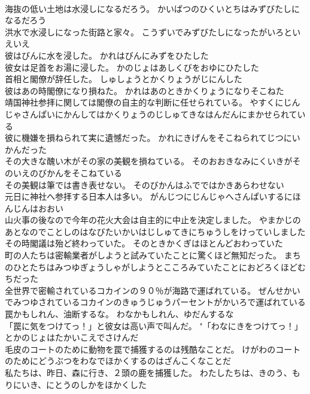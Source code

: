 \documentclass[8pt]{extreport}
\begin{document}
\begin{CJK}{UTF8}{min}
\\	海抜の低い土地は水浸しになるだろう。	かいばつのひくいとちはみずびたしになるだろう 
\\	洪水で水浸しになった街路と家々。	こうずいでみずびたしになったがいろといえいえ 
\\	彼はびんに水を浸した。	かれはびんにみずをひたした 
\\	彼女は足首をお湯に浸した。	かのじょはあしくびをおゆにひたした 
\\	首相と閣僚が辞任した。	しゅしょうとかくりょうがじにんした 
\\	彼はあの時閣僚になり損ねた。	かれはあのときかくりょうになりそこねた 
\\	靖国神社参拝に関しては閣僚の自主的な判断に任せられている。	やすくにじんじゃさんぱいにかんしてはかくりょうのじしゅてきなはんだんにまかせられている 
\\	彼に機嫌を損ねられて実に遺憾だった。	かれにきげんをそこねられてじつにいかんだった 
\\	その大きな醜い木がその家の美観を損ねている。	そのおおきなみにくいきがそのいえのびかんをそこねている 
\\	その美観は筆では書き表せない。	そのびかんはふでではかきあらわせない 
\\	元日に神社へ参拝する日本人は多い。	がんじつにじんじゃへさんぱいするにほんじんはおおい 
\\	山火事の後なので今年の花火大会は自主的に中止を決定しました。	やまかじのあとなのでことしのはなびたいかいはじしゅてきにちゅうしをけっていしました 
\\	その時閣議は殆ど終わっていた。	そのときかくぎはほとんどおわっていた 
\\	町の人たちは密輸業者がしようと試みていたことに驚くほど無知だった。	まちのひとたちはみつゆぎょうしゃがしようとこころみていたことにおどろくほどむちだった 
\\	全世界で密輸されているコカインの９０％が海路で運ばれている。	ぜんせかいでみつゆされているコカインのきゅうじゅうパーセントがかいろで運ばれている 
\\	罠かもしれん、油断するな。	わなかもしれん、ゆだんするな 
\\	「罠に気をつけてっ！」と彼女は高い声で叫んだ。	"「わなにきをつけてっ！」とかのじょはたかいこえでさけんだ 
\\	毛皮のコートのために動物を罠で捕獲するのは残酷なことだ。	けがわのコートのためにどうぶつをわなでほかくするのはざんこくなことだ 
\\	私たちは、昨日、森に行き、２頭の鹿を捕獲した。	わたしたちは、きのう、もりにいき、にとうのしかをほかくした 

\end{CJK}
\end{document}
